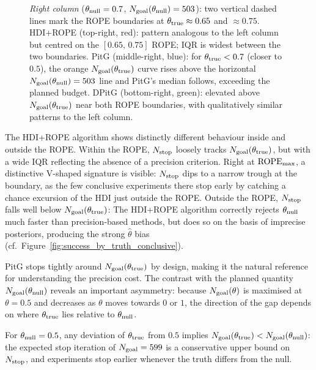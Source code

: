 \begin{figure}[h!]
  \textit{Right column} ($\theta_{\rm null}=0.7$, $N_{\rm goal}(\theta_{\rm null})=503$):
  two vertical dashed lines mark the ROPE boundaries at
  $\theta_{\rm true}\approx0.65$ and $\approx0.75$.
  HDI+ROPE (top-right, red): pattern analogous to the left column but centred on
  the $[0.65,\,0.75]$ ROPE; IQR is widest between the two boundaries.
  PitG (middle-right, blue): for $\theta_{\rm true}<0.7$ (closer to $0.5$), the
  orange $N_{\rm goal}(\theta_{\rm true})$ curve rises above the horizontal
  $N_{\rm goal}(\theta_{\rm null})=503$ line and PitG's median follows, exceeding
  the planned budget.
  DPitG (bottom-right, green): elevated above $N_{\rm goal}(\theta_{\rm true})$ near
  both ROPE boundaries, with qualitatively similar patterns to the left column.
  \label{fig:stop_iterations_by_truth_conclusive}
\end{figure}

The HDI+ROPE algorithm shows distinctly different behaviour inside and outside the ROPE.
Within the ROPE, $N_{\rm stop}$ loosely tracks $N_{\rm goal}(\theta_{\rm true})$, but
with a wide IQR reflecting the absence of a precision criterion.
Right at ${\rm ROPE}_{\rm max}$, a distinctive V-shaped signature is visible:
$N_{\rm stop}$ dips to a narrow trough at the boundary, as the few conclusive
experiments there stop early by catching a chance excursion of the HDI just outside
the ROPE. %
Outside the ROPE, $N_{\rm stop}$ falls well below $N_{\rm goal}(\theta_{\rm true})$:
The HDI+ROPE algorithm correctly
rejects $\theta_{\rm null}$ much faster than precision-based methods, but does so on
the basis of imprecise posteriors, producing the strong $\hat{\theta}$ bias
(cf.\ Figure~\ref{fig:success_by_truth_conclusive}).

PitG stops tightly around $N_{\rm goal}(\theta_{\rm true})$ by design, making it the
natural reference for understanding the precision cost. The contrast with the planned
quantity $N_{\rm goal}(\theta_{\rm null})$ reveals an important asymmetry: because
$N_{\rm goal}(\theta)$ is maximised at $\theta=0.5$ and decreases as $\theta$ moves
towards $0$ or $1$, the direction of the gap depends on where $\theta_{\rm true}$ lies
relative to $\theta_{\rm null}$.

For $\theta_{\rm null}=0.5$, any deviation of $\theta_{\rm true}$ from $0.5$ implies
$N_{\rm goal}(\theta_{\rm true}) < N_{\rm goal}(\theta_{\rm null})$: the expected stop
iteration of $N_{\rm goal}=599$ is a conservative upper bound on $N_{\rm stop}$,
and experiments stop earlier whenever the truth differs from the null.

